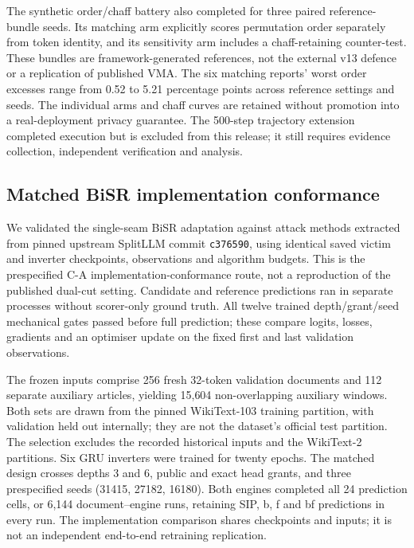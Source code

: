 \documentclass[11pt]{article}
\begin{document}
The synthetic order/chaff battery also completed for three paired reference-bundle seeds. Its matching arm explicitly scores permutation order separately from token identity, and its sensitivity arm includes a chaff-retaining counter-test. These bundles are framework-generated references, not the external v13 defence or a replication of published VMA. The six matching reports' worst order excesses range from 0.52 to 5.21 percentage points across reference settings and seeds. The individual arms and chaff curves are retained without promotion into a real-deployment privacy guarantee. The 500-step trajectory extension completed execution but is excluded from this release; it still requires evidence collection, independent verification and analysis.

\subsection{Matched BiSR implementation conformance}
\label{sec:bisr-conformance}
We validated the single-seam BiSR adaptation against attack methods extracted from pinned upstream SplitLLM commit \texttt{c376590}, using identical saved victim and inverter checkpoints, observations and algorithm budgets. This is the prespecified C-A implementation-conformance route, not a reproduction of the published dual-cut setting. Candidate and reference predictions ran in separate processes without scorer-only ground truth. All twelve trained depth/grant/seed mechanical gates passed before full prediction; these compare logits, losses, gradients and an optimiser update on the fixed first and last validation observations.

The frozen inputs comprise 256 fresh 32-token validation documents and 112 separate auxiliary articles, yielding 15{,}604 non-overlapping auxiliary windows. Both sets are drawn from the pinned WikiText-103 training partition, with validation held out internally; they are not the dataset's official test partition. The selection excludes the recorded historical inputs and the WikiText-2 partitions. Six GRU inverters were trained for twenty epochs. The matched design crosses depths 3 and 6, public and exact head grants, and three prespecified seeds (31415, 27182, 16180). Both engines completed all 24 prediction cells, or 6{,}144 document--engine runs, retaining SIP, b, f and bf predictions in every run. The implementation comparison shares checkpoints and inputs; it is not an independent end-to-end retraining replication.
\end{document}
